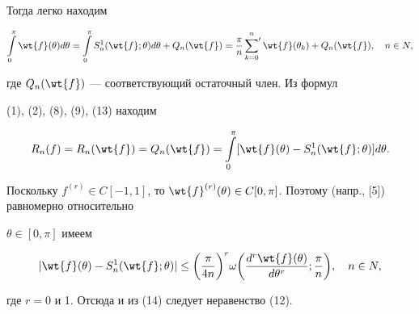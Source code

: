 Тогда легко находим


\begin{equation}


\int \limits_0^ \pi \wt{f}( \theta) d \theta = \int \limits_0^ \pi


S_n^1( \wt{f}; \theta) d \theta + Q_n( \wt{f}) =


\frac{\pi}{n} \sideset{}{'}\sum_{k=0}^n \wt{f}( \theta_k) + Q_n( \wt{f}),


\quad n \in N,


\end{equation}


где $Q_n( \wt{f})$ --- соответствующий остаточный член. Из формул


(1), (2), (8), (9), (13) находим


\begin{equation}


R_n(f) = R_n( \wt{f}) = Q_n(\wt{f}) = \int \limits_0^ \pi


[\wt{f}( \theta) - S_n^1( \wt{f}; \theta)] d \theta.


\end{equation}


Поскольку $f^{(r)} \in C[-1,1]$, то $\wt{f}^{(r)}( \theta) \in


C[0,\pi]$. Поэтому (напр., [5]) равномерно относительно


$\theta \in [0,\pi]$ имеем


$$


| \wt{f}( \theta) - S_n^1( \wt{f}; \theta) | \leq \bigg(


\frac{\pi}{4n}\bigg)^r \omega\bigg( \frac{d^r \wt{f}( \theta)}{d \theta^r};


\frac{\pi}{n}\bigg), \quad n \in N,


$$


где $r=0$ и 1. Отсюда и из (14) следует неравенство (12).





